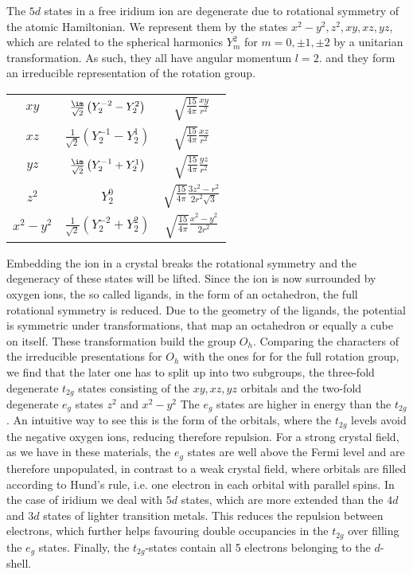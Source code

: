 \documentclass[a4paper,12pt]{report}
\begin{document}
The $5d$ states  in a free iridium ion are degenerate due to rotational symmetry of the atomic Hamiltonian. 
We represent them by the states $x^2-y^2,z^2,xy,xz,yz$, which are related to the spherical harmonics $Y^2_m$ for $m=0,\pm1,\pm2$ by a unitarian transformation.
As such, they all have angular momentum $l=2$. 
and they form an irreducible representation of the rotation group.
\begin{center}
\begin{tabular}{|c|c|c|}
 \hline
 $xy$ & $\frac{\im}{\sqrt 2} \left( Y^{-2}_2 - Y^2_2 \right)$ & $\sqrt{\frac{15}{4\pi}} \frac{xy}{r^2}$ \\
 $xz$ & $\frac{  1}{\sqrt 2} \left( Y^{-1}_2 - Y^1_2 \right)$ & $\sqrt{\frac{15}{4\pi}} \frac{xz}{r^2}$ \\
 $yz$ & $\frac{\im}{\sqrt 2} \left( Y^{-1}_2 + Y^1_2 \right)$ & $\sqrt{\frac{15}{4\pi}} \frac{yz}{r^2}$ \\
 $z^2$& $ Y^0_{2} 					      $	& $\sqrt{\frac{15}{4\pi}} \frac{3z^2-r^2}{2r^2\sqrt 3} $\\
 $x^2-y^2$&$\frac1{\sqrt 2} \left( Y^{-2}_2 + Y^2_2 \right) $ & $\sqrt{\frac{15}{4\pi}} \frac{x^2-y^2}{2r^2} $ \\
 \hline
\end{tabular}
\end{center}
%
Embedding the ion in a crystal breaks the rotational symmetry and the degeneracy of these states will be lifted.
Since the ion is now surrounded by oxygen ions, the so called ligands, in the form of an octahedron, the 
full rotational symmetry is reduced.
Due to the geometry of the ligands, the potential is symmetric under transformations, that map an octahedron or equally a cube on itself.
These transformation build the group $O_h$.
Comparing the characters of the irreducible presentations for  $O_h$ with the ones for for the full rotation group, we find that 
the later one has to split up into two subgroups, 
the three-fold degenerate $t_{2g}$ states consisting of the $xy,xz,yz$ orbitals and the two-fold degenerate $e_g$ states $z^2$ and $x^2-y^2$ \cite[Chapter~4]{Tinkham64} 
The $e_g$ states are higher in energy than the $t_{2g}$.
An intuitive way to see this is the form of the orbitals, where the $t_{2g}$ levels avoid the negative oxygen ions, reducing therefore repulsion. 
For a strong crystal field, as we have in these materials, the $e_g$ states are well above the Fermi level and are therefore unpopulated,
in contrast to a weak crystal field, where orbitals are filled according to Hund's rule, i.e. one electron in each orbital with parallel spins.
In the case of iridium we deal with  $5d$ states, which are more extended than the $4d$ and $3d$ states of lighter transition metals. 
This reduces the repulsion between electrons, which further helps favouring double occupancies in the $t_{2g}$ over filling the $e_g$ states.
Finally, the $t_{2g}$-states contain all 5 electrons belonging to the $d$-shell.
\end{document}
